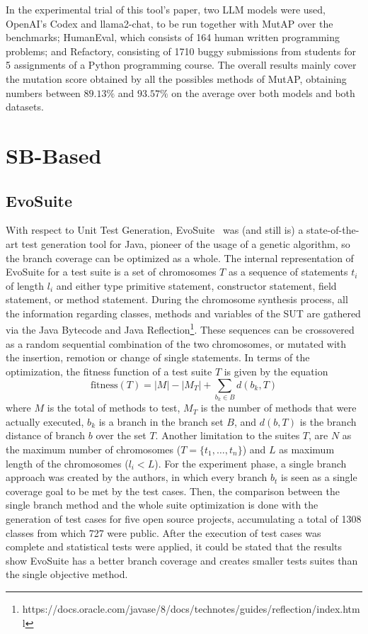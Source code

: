 \documentclass[%
  chapterprefix=false,%
  open=right,%
  twoside=true,%
  paper=a4,%
  logofile={Figures/logo.png},%
  thesistype=master,%
  UKenglish,%
]{se2thesis}
\begin{document}
In the experimental trial of this tool's paper, two LLM models were used, OpenAI's Codex and llama2-chat, to be run together with MutAP over the benchmarks; HumanEval, which consists of 164 human written programming problems; and Refactory, consisting of 1710 buggy submissions from students for 5 assignments of a Python programming course.
The overall results mainly cover the mutation score obtained by all the possibles methods of MutAP, obtaining numbers between \(89.13\%\) and \(93.57\%\) on the average over both models and both datasets.


\section{SB-Based}

\subsection*{EvoSuite}

With respect to Unit Test Generation, EvoSuite~\cite{DBLP:conf/qsic/FraserA11} was (and still is) a state-of-the-art test generation tool for Java, pioneer of the usage of a genetic algorithm, so the branch coverage can be optimized as a whole.
The internal representation of EvoSuite for a test suite is a set of chromosomes \(T\) as a sequence of statements \(t_i\) of length \(l_i\) and either type primitive statement, constructor statement, field statement, or method statement.
During the chromosome synthesis process, all the information regarding classes, methods and variables of the SUT are gathered via the Java Bytecode and Java Reflection\footnote{https://docs.oracle.com/javase/8/docs/technotes/guides/reflection/index.html}.
These sequences can be crossovered as a random sequential combination of the two chromosomes, or mutated with the insertion, remotion or change of single statements.
In terms of the optimization, the fitness function of a test suite $T$ is given by the equation
\[ \text{fitness}(T) = |M| - |M_T| + \sum_{b_k \in B} d(b_k, T) \]
where \(M\) is the total of methods to test, \(M_T\) is the number of methods that were actually executed, \(b_k\) is a branch in the branch set \(B\), and \(d(b, T)\) is the branch distance of branch \(b\) over the set \(T\).
Another limitation to the suites \(T\), are \(N\) as the maximum number of chromosomes (\(T = \{t_1, \dots , t_n\}\)) and \(L\) as maximum length of the chromosomes (\(l_i < L\)).
For the experiment phase, a single branch approach was created by the authors, in which every branch \(b_t\) is seen as a single coverage goal to be met by the test cases.
Then, the comparison between the single branch method and the whole suite optimization is done with the generation of test cases for five open source projects, accumulating a total of 1308 classes from which 727 were public.
After the execution of test cases was complete and statistical tests were applied, it could be stated that the results show EvoSuite has a better branch coverage and creates smaller tests suites than the single objective method.
\end{document}
